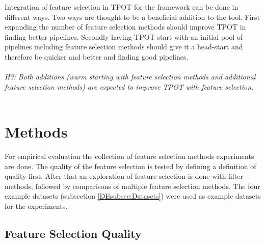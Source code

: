 \documentclass[10pt,a4paper]{report}
\begin{document}
\begin{enumerate}
		Integration of feature selection in TPOT for the framework can be done in different ways. Two ways are thought to be a beneficial addition to the tool. First expanding the number of feature selection methods should improve TPOT in finding better pipelines. Secondly having TPOT start with an initial pool of pipelines including feature selection methods should give it a head-start and therefore be quicker and better and finding good pipelines.\\
		\\
		\emph{H3: Both additions (warm starting with feature selection methods and additional feature selection methods) are expected to improve TPOT with feature selection.}\\
		\\
		
				
	\end{enumerate}
	
	\newpage
	\section{Methods}
	\label{FSsec:Methods}
	
	For empirical evaluation the collection of feature selection methods experiments are done. The quality of the feature selection is tested by defining a definition of quality first. After that an exploration of feature selection is done with filter methods, followed by comparisons of multiple feature selection methods. The four example datasets (subsection \ref{DEsubsec:Datasets}) were used as example datasets for the experiments.
	
	\subsection{Feature Selection Quality}
	\label{FSsubsec:DimensionalityReductionQuality}
	
\end{document}
